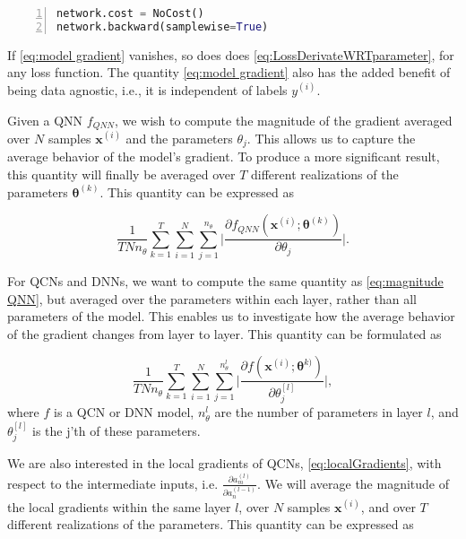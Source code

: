 \begin{lstlisting}[language=python, numbers=left]
network.cost = NoCost()
network.backward(samplewise=True)
\end{lstlisting}

If \cref{eq:model gradient} vanishes, so does does \cref{eq:LossDerivateWRTparameter}, for any loss function. The quantity \cref{eq:model gradient} also has the added benefit of being data agnostic, i.e., it is independent of labels $y^{(i)}$.

Given a QNN $f_{QNN}$, we wish to compute the magnitude of the gradient averaged over $N$ samples $\boldsymbol{x}^{(i)}$ and the parameters $\theta_j$. This allows us to capture the average behavior of the model's gradient. To produce a more significant result, this quantity will finally be averaged over $T$ different realizations of the parameters $\boldsymbol{\theta}^{(k)}$. This quantity can be expressed as

\begin{equation}\label{eq:magnitude QNN}
    \frac{1}{TNn_{\theta}}\sum_{k=1}^T\sum_{i=1}^N \sum_{j=1}^{n_{\theta}}\big|\frac{\partial f_{QNN}(\boldsymbol{x}^{(i)};\boldsymbol{\theta}^{(k)})}{\partial \theta_j}\big|.
\end{equation}

For QCNs and DNNs, we want to compute the same quantity as \cref{eq:magnitude QNN}, but averaged over the parameters within each layer, rather than all parameters of the model. This enables us to investigate how the average behavior of the gradient changes from layer to layer. This quantity can be formulated as

\begin{equation}\label{eq:magnitude QCN DNN}
    \frac{1}{TNn_{\theta}}\sum_{k=1}^T\sum_{i=1}^N \sum_{j=1}^{n_{\theta}^{l}}\big|\frac{\partial f(\boldsymbol{x}^{(i)};\boldsymbol{\theta}^{k)})}{\partial \theta^{[l]}_j}\big|,
\end{equation}
where $f$ is a QCN or DNN model, $n_{\theta}^{l}$ are the number of parameters in layer $l$, and $\theta^{[l]}_j$ is the j'th of these parameters.


We are also interested in the local gradients of QCNs, \cref{eq:localGradients}, with respect to the intermediate inputs, i.e. $\frac{\partial a_{m}^{(l)}}{\partial a_{n}^{(l-1)}}$. We will average the magnitude of the local gradients within the same layer $l$, over $N$ samples $\boldsymbol{x}^{(i)}$, and over $T$ different realizations of the parameters. This quantity can be expressed as 

